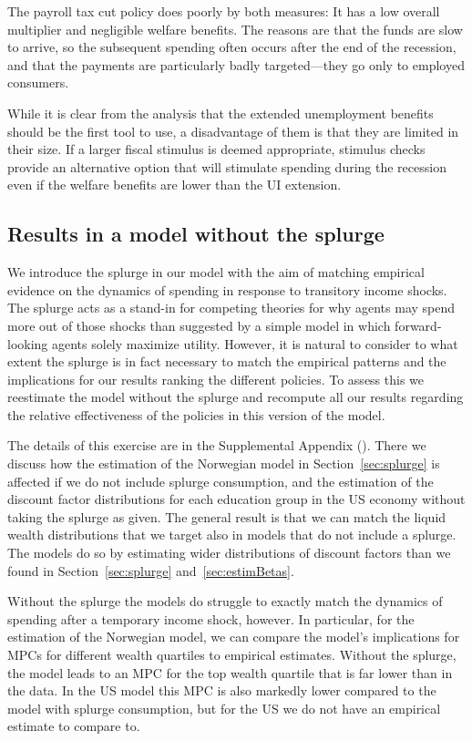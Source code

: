 \documentclass[qe,draft]{econsocart}
\theoremstyle{plain}
\theoremstyle{definition}
\begin{document}
The payroll tax cut policy does poorly by both measures: It has a low overall multiplier and negligible welfare benefits.
The reasons are that the funds are slow to arrive, so the subsequent spending often occurs after the end of the recession, and that the payments are particularly badly targeted---they go only to employed consumers.

While it is clear from the analysis that the extended unemployment benefits should be the first tool to use, a disadvantage of them is that they are limited in their size.
If a larger fiscal stimulus is deemed appropriate, stimulus checks provide an alternative option that will stimulate spending during the recession even if the welfare benefits are lower than the UI extension.

\FloatBarrier
\subsection{Results in a model without the splurge}

We introduce the splurge in our model with the aim of matching empirical evidence on the dynamics of spending in response to transitory income shocks.
The splurge acts as a stand-in for competing theories for why agents may spend more out of those shocks than suggested by a simple model in which forward-looking agents solely maximize utility.
However, it is natural to consider to what extent the splurge is in fact necessary to match the empirical patterns and the implications for our results ranking the different policies.
To assess this we  reestimate the model without the splurge and recompute all our results regarding the relative effectiveness of the policies in this version of the model.

The details of this exercise are in the Supplemental Appendix (\cite{carroll2026welfareSupplement}).
There we discuss how the estimation of the Norwegian model in Section~\ref{sec:splurge} is affected if we do not include splurge consumption, and the estimation of the discount factor distributions for each education group in the US economy without taking the splurge as given.
The general result is that we can match the liquid wealth distributions that we target also in models that do not include a splurge.
The models do so by estimating wider distributions of discount factors than we found in Section~\ref{sec:splurge} and~\ref{sec:estimBetas}.

Without the splurge the models do struggle to exactly match the dynamics of spending after a temporary income shock, however.
In particular, for the estimation of the Norwegian model, we can compare the model's implications for MPCs for different wealth quartiles to empirical estimates.
Without the splurge, the model leads to an MPC for the top wealth quartile that is far lower than in the data.
In the US model this MPC is also markedly lower compared to the model with splurge consumption, but for the US we do not have an empirical estimate to compare to.
\end{document}
